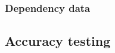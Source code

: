\subsubsection{Dependency data} %
\label{ssub:depdata}


\subsection{Accuracy testing} %
\label{sub:accuracy-testing}



